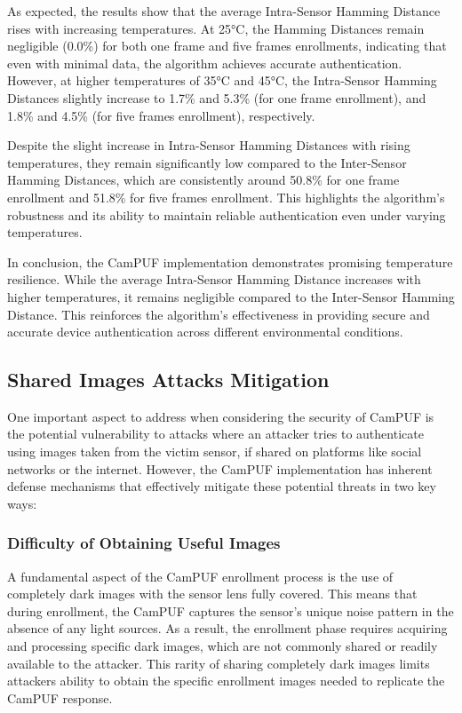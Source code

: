As expected, the results show that the average Intra-Sensor Hamming Distance rises with increasing temperatures. At 25°C, the Hamming Distances remain negligible (0.0\%) for both one frame and five frames enrollments, indicating that even with minimal data, the algorithm achieves accurate authentication. However, at higher temperatures of 35°C and 45°C, the Intra-Sensor Hamming Distances slightly increase to 1.7\% and 5.3\% (for one frame enrollment), and 1.8\% and 4.5\% (for five frames enrollment), respectively.

Despite the slight increase in Intra-Sensor Hamming Distances with rising temperatures, they remain significantly low compared to the Inter-Sensor Hamming Distances, which are consistently around 50.8\% for one frame enrollment and 51.8\% for five frames enrollment. This highlights the algorithm's robustness and its ability to maintain reliable authentication even under varying temperatures.

In conclusion, the CamPUF implementation demonstrates promising temperature resilience. While the average Intra-Sensor Hamming Distance increases with higher temperatures, it remains negligible compared to the Inter-Sensor Hamming Distance. This reinforces the algorithm's effectiveness in providing secure and accurate device authentication across different environmental conditions.

\subsection{Shared Images Attacks Mitigation}

One important aspect to address when considering the security of CamPUF is the potential vulnerability to attacks where an attacker tries to authenticate using images taken from the victim sensor, if shared on platforms like social networks or the internet. However, the CamPUF implementation has inherent defense mechanisms that effectively mitigate these potential threats in two key ways:

\subsubsection{Difficulty of Obtaining Useful Images}

A fundamental aspect of the CamPUF enrollment process is the use of completely dark images with the sensor lens fully covered. This means that during enrollment, the CamPUF captures the sensor's unique noise pattern in the absence of any light sources. As a result, the enrollment phase requires acquiring and processing specific dark images, which are not commonly shared or readily available to the attacker. This rarity of sharing completely dark images limits attackers ability to obtain the specific enrollment images needed to replicate the CamPUF response.

